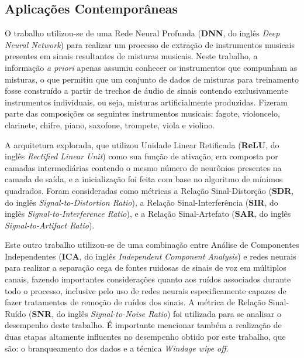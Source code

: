 






\subsection{Aplicações Contemporâneas}
\label{subsec:contemp_app}

O trabalho \citep{7178348} utilizou-se de uma Rede Neural Profunda (\textbf{DNN}, do inglês \textit{Deep Neural Network}) para realizar um processo de extração de instrumentos musicais presentes em sinais resultantes de misturas musicais. Neste trabalho, a informação \textit{a priori} apenas assumiu conhecer os instrumentos que compunham as misturas, o que permitiu que um conjunto de dados de misturas para treinamento fosse construído a partir de trechos de áudio de sinais contendo exclusivamente instrumentos individuais, ou seja, misturas artificialmente produzidas. Fizeram parte das composições os seguintes instrumentos musicais: fagote, violoncelo, clarinete, chifre, piano, saxofone, trompete, viola e violino.


A arquitetura explorada, que utilizou Unidade Linear Retificada (\textbf{ReLU}, do inglês \textit{Rectified Linear Unit}) \citep{nair2010rectified} como sua função de ativação, era composta por camadas intermediárias contendo o mesmo número de neurônios presentes na camada de saída, e a inicialização foi feita com base no algoritmo de mínimos quadrados. Foram consideradas como métricas a Relação Sinal-Distorção (\textbf{SDR}, do inglês \textit{Signal-to-Distortion Ratio}), a Relação Sinal-Interferência (\textbf{SIR}, do inglês \textit{Signal-to-Interference Ratio}), e a Relação Sinal-Artefato (\textbf{SAR}, do inglês \textit{Signal-to-Artifact Ratio}).


Este outro trabalho \citep{6245800} utilizou-se de uma combinação entre Análise de Componentes Independentes (\textbf{ICA}, do inglês \textit{Independent Component Analysis}) e redes neurais para realizar a separação cega de fontes ruidosas de sinais de voz em múltiplos canais, fazendo importantes considerações quanto aos ruídos associados durante todo o processo, inclusive pelo uso de redes neurais especificamente capazes de fazer tratamentos de remoção de ruídos dos sinais. A métrica de Relação Sinal-Ruído (\textbf{SNR}, do inglês \textit{Signal-to-Noise Ratio}) foi utilizada para se analisar o desempenho deste trabalho. É importante mencionar também a realização de duas etapas altamente influentes no desempenho obtido por este trabalho, que são: o branqueamento dos dados e a técnica \textit{Windage wipe off}.


